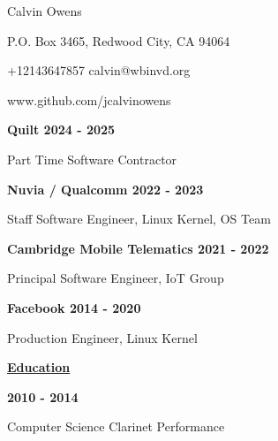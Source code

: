 \documentclass[11pt]{article}
\begin{document}
\centerline{{\Huge \sc Calvin Owens}}
\centerline{P.O. Box 3465, Redwood City, CA 94064}
\centerline{+12143647857 \textbullet \hspace{1pt} calvin@wbinvd.org}
\centerline{www.github.com/jcalvinowens}

\noindent
\hrulefill

\noindent\centerline{\bf Quilt \hfill 2024 - 2025}
Part Time Software Contractor \\

\noindent\centerline{\bf Nuvia / Qualcomm \hfill 2022 - 2023}
Staff Software Engineer, Linux Kernel, OS Team \\

\noindent\centerline{\bf Cambridge Mobile Telematics \hfill 2021 - 2022}
Principal Software Engineer, IoT Group \\

\noindent\centerline{\bf Facebook \hfill 2014 - 2020}
Production Engineer, Linux Kernel

\noindent
\hrulefill

\centerline{\underline{\bf Education}}
\smallskip
{} \hfill {\bf 2010 - 2014}

\smallskip

\noindent\centerline{\hfill \textbullet \hspace{1pt} Computer Science \hfill \textbullet \hspace{1pt} Clarinet Performance \hfill }

\noindent
\hrulefill
\end{document}
